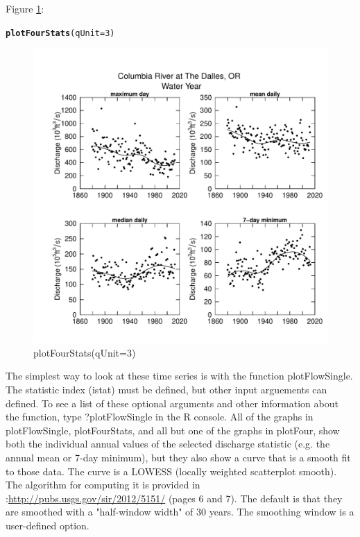 \documentclass[a4paper,11pt]{article}\usepackage{graphicx, color}
\makeatletter
\newcommand{\hlfunctioncall}[1]{\textcolor[rgb]{0.501960784313725,0,0.329411764705882}{\textbf{#1}}}%
\newenvironment{kframe}{%
 \def\at@end@of@kframe{}%
 \ifinner\ifhmode%
  \def\at@end@of@kframe{\end{minipage}}%
  \begin{minipage}{\columnwidth}%
 \fi\fi%
 \def\FrameCommand##1{\hskip\@totalleftmargin \hskip-\fboxsep
 \colorbox{shadecolor}{##1}\hskip-\fboxsep
     \hskip-\linewidth \hskip-\@totalleftmargin \hskip\columnwidth}%
 \MakeFramed {\advance\hsize-\width
   \@totalleftmargin\z@ \linewidth\hsize
   \@setminipage}}%
 {\par\unskip\endMakeFramed%
 \at@end@of@kframe}
\newenvironment{knitrout}{}{} %
\makeatother
\begin{document}
Figure \ref{fig:plotFourStats}:
\begin{knitrout}
\color{fgcolor}\begin{kframe}
\begin{alltt}
\hlfunctioncall{plotFourStats}(qUnit=3)
\end{alltt}
\end{kframe}\begin{figure}[]

\includegraphics[width=1\linewidth,height=1\linewidth]{figure/plotFourStats} \caption[plotFourStats(qUnit=3)]{plotFourStats(qUnit=3)\label{fig:plotFourStats}}
\end{figure}


\end{knitrout}



\FloatBarrier

The simplest way to look at these time series is with the function plotFlowSingle. The statistic index (istat) must be defined, but other input arguements can defined. To see a list of these optional arguments and other information about the function, type ?plotFlowSingle in the R console. All of the graphs in plotFlowSingle, plotFourStats, and all but one of the graphs in plotFour, show both the individual annual values of the selected discharge statistic (e.g. the annual mean or 7-day minimum), but they also show a curve that is a smooth fit to those data.  The curve is a LOWESS (locally weighted scatterplot smooth).  The algorithm for computing it is provided in \cite{HirschV}:\url{http://pubs.usgs.gov/sir/2012/5151/}  (pages 6 and 7).  The default is that they are smoothed with a "half-window width" of 30 years.  The smoothing window is a user-defined option. 
\end{document}
